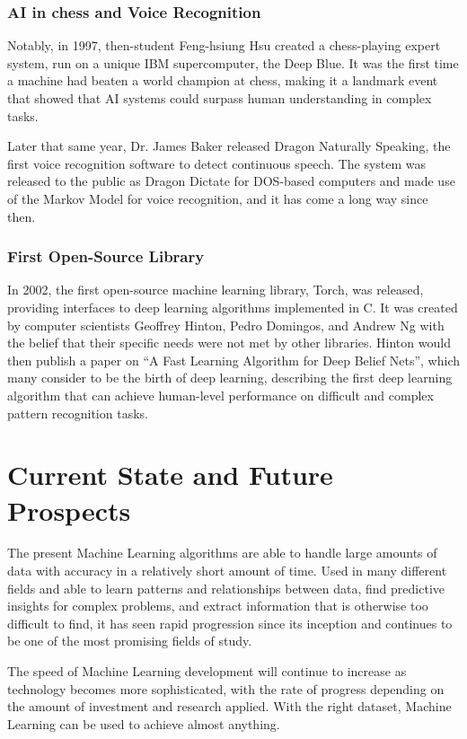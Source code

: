 \documentclass{article}
\begin{document}
\subsubsection{AI in chess and Voice Recognition}
Notably, in 1997, then-student Feng-hsiung Hsu created a chess-playing expert system, run on a unique IBM supercomputer, the Deep Blue. It was the first time a machine had beaten a world champion at chess, making it a landmark event that showed that AI systems could surpass human understanding in complex tasks. 
\par
Later that same year, Dr. James Baker released Dragon Naturally Speaking, the first voice recognition software to detect continuous speech. The system was released to the public as Dragon Dictate for DOS-based computers and made use of the Markov Model for voice recognition, and it has come a long way since then. 
\par
\subsubsection{First Open-Source Library}
In 2002, the first open-source machine learning library, Torch, was released, providing interfaces to deep learning algorithms implemented in C. It was created by computer scientists Geoffrey Hinton, Pedro Domingos, and Andrew Ng with the belief that their specific needs were not met by other libraries. Hinton would then publish a paper on ``A Fast Learning Algorithm for Deep Belief Nets'', which many consider to be the birth of deep learning, describing the first deep learning algorithm that can achieve human-level performance on difficult and complex pattern recognition tasks. 
\par
\section{Current State and Future Prospects}
The present Machine Learning algorithms are able to handle large amounts of data with accuracy in a relatively short amount of time. Used in many different fields and able to learn patterns and relationships between data, find predictive insights for complex problems, and extract information that is otherwise too difficult to find, it has seen rapid progression since its inception and continues to be one of the most promising fields of study. 
\par
The speed of Machine Learning development will continue to increase as technology becomes more sophisticated, with the rate of progress depending on the amount of investment and research applied. With the right dataset, Machine Learning can be used to achieve almost anything. 
\par
\end{document}
